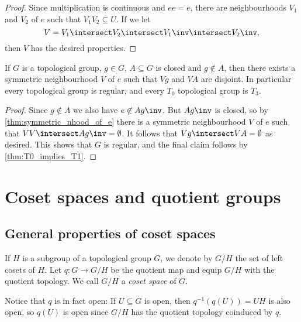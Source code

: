\documentclass[article, a4paper, 11pt, oneside]{memoir}
\numberwithin{equation}{chapter}
\newcommand{\preim}{^{-1}}
\begin{document}
\begin{proof}
    Since multiplication is continuous and $ee = e$, there are neighbourhoods $V_1$ and $V_2$ of $e$ such that $V_1 V_2 \subseteq U$. If we let
    \begin{equation*}
        V = V_1 \intersect V_2 \intersect V_1\inv \intersect V_2\inv,
    \end{equation*}
    then $V$ has the desired properties.
\end{proof}


\begin{proposition}
    \label{thm:topological_group_regular}
    If $G$ is a topological group, $g \in G$, $A \subseteq G$ is closed and $g \not\in A$, then there exists a symmetric neighbourhood $V$ of $e$ such that $Vg$ and $VA$ are disjoint. In particular every topological group is regular, and every $T_0$ topological group is $T_3$.
\end{proposition}

\begin{proof}
    Since $g \not\in A$ we also have $e \not\in Ag\inv$. But $Ag\inv$ is closed, so by \cref{thm:symmetric_nhood_of_e} there is a symmetric neighbourhood $V$ of $e$ such that $VV \intersect Ag\inv = \emptyset$. It follows that $Vg \intersect VA = \emptyset$ as desired. This shows that $G$ is regular, and the final claim follows by \cref{thm:T0_implies_T1}.
\end{proof}


\chapter{Coset spaces and quotient groups}

\section{General properties of coset spaces}

If $H$ is a subgroup of a topological group $G$, we denote by $G/H$ the set of left cosets of $H$. Let $q \colon G \to G/H$ be the quotient map and equip $G/H$ with the quotient topology. We call $G/H$ a \emph{coset space} of $G$.

Notice that $q$ is in fact open: If $U \subseteq G$ is open, then $q\preim(q(U)) = UH$ is also open, so $q(U)$ is open since $G/H$ has the quotient topology coinduced by $q$.
\end{document}
